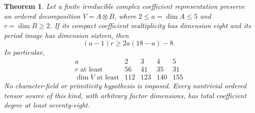 \documentclass[11pt]{article}
\newtheorem{theorem}{Theorem}[section]
\theoremstyle{definition}
\theoremstyle{remark}
\begin{document}
\begin{theorem}\label{thm:ordered-small-factors78}
Let a finite irreducible complex coefficient representation
preserve an ordered decomposition $V=A\otimes B$, where
$2\leq a=\dim A\leq5$ and $r=\dim B\geq2$.
If its compact coefficient multiplicity has dimension eight
and its period image has dimension sixteen, then
\begin{equation}\label{eq:small-factor-main}
                         (a-1)r\geq2a(18-a)-8.
\end{equation}
In particular,
\[
\begin{array}{c|rrrr}
 a&2&3&4&5\\ \hline
 r\text{ at least}&56&41&35&31\\
 \dim V\text{ at least}&112&123&140&155
\end{array}
\]
No character-field or primitivity hypothesis is imposed.
Every nontrivial ordered tensor source of this kind, with
arbitrary factor dimensions, has total coefficient degree
at least seventy-eight.
\end{theorem}
\end{document}
